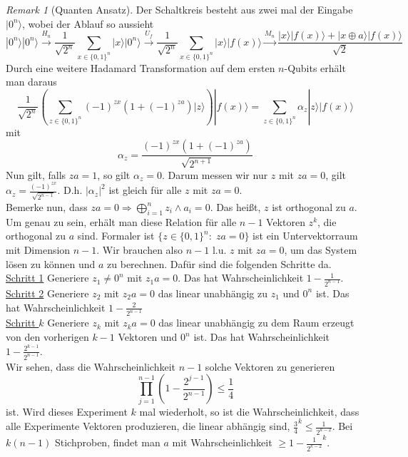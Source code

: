 \documentclass[a4paper, 12pt]{article}
\theoremstyle{plain}
\theoremstyle{definition}
\theoremstyle{lemma}
\theoremstyle{remark}
\newtheorem{remark}[theorem]{Remark}
\theoremstyle{example}
\begin{document}
	\begin{remark}[Quanten Ansatz]
		Der Schaltkreis besteht aus zwei mal der Eingabe $|0^n\rangle$, wobei der Ablauf so aussieht \[|0^n\rangle |0^n\rangle \overset{H_n}{\to} \frac{1}{\sqrt{2^n}} \sum_{x \in \{0,1\}^n} |x\rangle |0^n\rangle \overset{U_f}{\to} \frac{1}{\sqrt{2^n}} \sum_{x \in \{0,1\}^n} |x\rangle |f(x)\rangle \overset{M_n}{\to} \frac{|x\rangle |f(x)\rangle + |x\oplus a\rangle|f(x)\rangle}{\sqrt{2}}\] Durch eine weitere Hadamard Transformation auf dem ersten $n$-Qubits erhält man daraus \[\frac{1}{\sqrt{2^n}} \left( \sum_{z \in \{0,1\}^n} (-1)^{zx}(1+(-1)^{za})|z\rangle\right) |f(x)\rangle = \sum_{z \in \{0,1\}^n} \alpha_z|z\rangle|f(x)\rangle\] mit \[\alpha_z = \frac{(-1)^{zx}(1+(-1)^{za})}{\sqrt{2^{n+1}}}\]
		Nun gilt, falls $za = 1$, so gilt $\alpha_z= 0$. Darum messen wir nur $z$ mit $za = 0$, gilt $\alpha_z = \frac{(-1)^{zx}}{\sqrt{2^{n-1}}}$. D.h. $\left|\alpha_z\right|^2$ ist gleich für alle $z$ mit $za = 0$.\\
		Bemerke nun, dass $za = 0 \Rightarrow \bigoplus_{i=1}^n z_i\land a_i = 0$. Das heißt, $z$ ist orthogonal zu $a$. Um genau zu sein, erhält man diese Relation für alle $n-1$ Vektoren $z^k$, die orthogonal zu $a$ sind. Formaler ist $\{z \in \{0,1\}^n: \; za = 0\}$ ist ein Untervektorraum mit Dimension $n-1$. Wir brauchen also $n-1$ l.u. $z$ mit $za = 0$, um das System lösen zu können und $a$ zu berechnen. Dafür sind die folgenden Schritte da.\\
		\underline{Schritt 1} Generiere $z_1\neq 0^n$ mit $z_1a = 0$. Das hat Wahrscheinlichkeit $1-\frac{1}{2^{n-1}}$.\\
		\underline{Schritt 2} Generiere $z_2$ mit $z_2a = 0$ das linear unabhängig zu $z_1$ und $0^n$ ist. Das hat Wahrscheinlichkeit $1-\frac{2}{2^{n-1}}$\\
		\underline{Schritt $k$} Generiere $z_k$ mit $z_ka = 0$ das linear unabhängig zu dem Raum erzeugt von den vorherigen $k-1$ Vektoren und $0^n$ ist. Das hat Wahrscheinlichkeit $1-\frac{2^{k-1}}{2^{n-1}}$.\\
		Wir sehen, dass die Wahrscheinlichkeit $n-1$ solche Vektoren zu generieren \[\prod_{j=1}^{n-1} (1-\frac{2^{j-1}}{2^{n-1}}) \leq \frac{1}{4}\] ist. Wird dieses Experiment $k$ mal wiederholt, so ist die Wahrscheinlichkeit, dass alle Experimente Vektoren produzieren, die linear abhängig sind, $\frac{3}{4}^k \leq \frac{1}{2^{k-2}}$. Bei $k(n-1)$ Stichproben, findet man $a$ mit Wahrscheinlichkeit $\geq 1-\frac{1}{2^{k-2}}^k$. 
	\end{remark}
\end{document}
